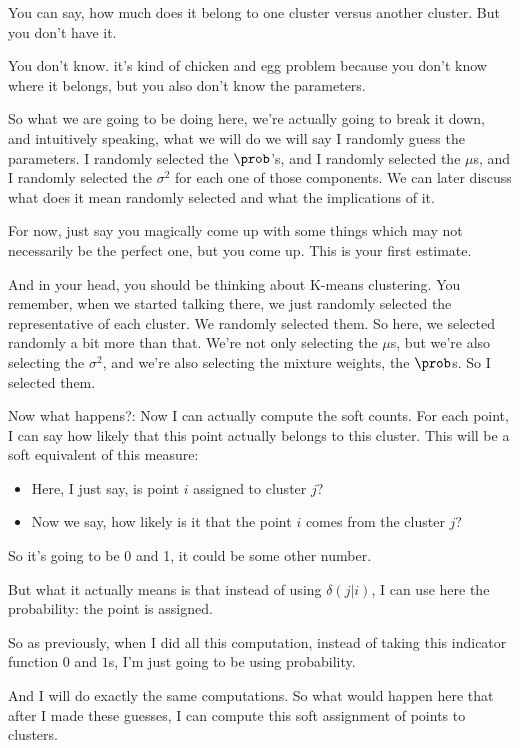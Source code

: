 \documentclass[a4paper, 12pt]{article}
\begin{document}
You can say, how much does it belong to one cluster versus another cluster. But
you don't have it.

You don't know. it's kind of chicken and egg problem because you don't know
where it belongs, but you also don't know the parameters.

So what we are going to be doing here, we're actually going to break it down,
and intuitively speaking, what we will do we will say I randomly guess the
parameters. I randomly selected the \(\prob\)'s, and I randomly selected the
\(\mu\)s, and I randomly selected the \(\sigma^2\) for each one of those
components. We can later discuss what does it mean randomly selected and what
the implications of it.

For now, just say you magically come up with some things which may not
necessarily be the perfect one, but you come up. This is your first estimate.

And in your head, you should be thinking about K-means clustering. You remember,
when we started talking there, we just randomly selected the representative of
each cluster. We randomly selected them. So here, we selected randomly a bit
more than that. We're not only selecting the \(\mu\)s, but we're also selecting
the \(\sigma^2\), and we're also selecting the mixture weights, the \(\prob\)s.
So I selected them.

Now what happens?: Now I can actually compute the soft counts. For each point, I
can say how likely that this point actually belongs to this cluster. This will
be a soft equivalent of this measure:

\begin{itemize}
\item Here, I just say, is point \(i\) assigned to cluster \(j\)?
\item Now we say, how likely is it that the point \(i\) comes from the cluster
\(j\)?
\end{itemize}

So it's going to be 0 and 1, it could be some other number.

But what it actually means is that instead of using \(\delta(j|i)\), I can use
here the probability: the point is assigned.

So as previously, when I did all this computation, instead of taking this
indicator function \(0\) and \(1\)s, I'm just going to be using probability.

And I will do exactly the same computations. So what would happen here that
after I made these guesses, I can compute this soft assignment of points to
clusters.
\end{document}
